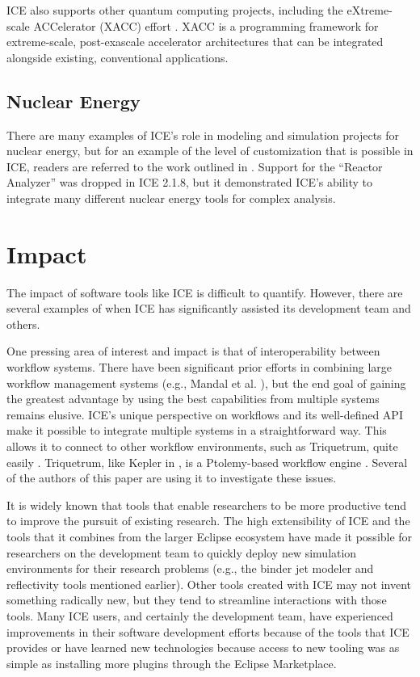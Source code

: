 ICE also supports other quantum computing projects, including the
eXtreme-scale ACCelerator (XACC) effort
\cite{mccaskey_ornl-qci/xacc_2016}. XACC is a programming framework for
extreme-scale, post-exascale accelerator architectures that can be
integrated alongside existing, conventional applications.

\subsection{Nuclear Energy}\label{nuclear-energy}

There are many examples of ICE's role in modeling and simulation
projects for nuclear energy, but for an example of the level of
customization that is possible in ICE, readers are referred to the work outlined in
\cite{billings_domain-specific_2015}. Support for the ``Reactor
Analyzer'' was dropped in ICE 2.1.8, but it demonstrated ICE's ability
to integrate many different nuclear energy tools for complex analysis.

\section{Impact}\label{impact}

The impact of software tools like ICE is difficult to quantify. However,
there are several examples of when ICE has significantly assisted its
development team and others.

One pressing area of interest and impact is that of interoperability
between workflow systems. There have been significant prior efforts in combining
large workflow management systems (e.g., Mandal et al.
\cite{mandal_integrating_2007}), but the end goal of gaining the greatest
advantage by using the best capabilities from multiple systems remains elusive.
ICE's unique perspective on workflows and its well-defined API make it
possible to integrate multiple systems in a straightforward way. This
allows it to connect to other workflow environments, such as Triquetrum,
quite easily \cite{brooks_introducing_2016}. Triquetrum, like Kepler in
\cite{mandal_integrating_2007}, is a Ptolemy-based workflow engine
\cite{brooks_triquetrum:_2015}. Several of the authors of this paper are using
it to investigate these issues.

It is widely known that tools that enable researchers to be more productive tend
to improve the pursuit of existing research. The high extensibility of
ICE and the tools that it combines from the larger Eclipse ecosystem
have made it possible for researchers on the development team to quickly
deploy new simulation environments for their research problems (e.g., the binder jet
modeler and reflectivity tools mentioned earlier). Other tools created
with ICE may not invent something radically new, but they tend to
streamline interactions with those tools. Many ICE users, and certainly
the development team, have experienced improvements in their software
development efforts because of the tools that ICE provides or have learned
new technologies because access to new tooling was as simple as
installing more plugins through the Eclipse Marketplace.

